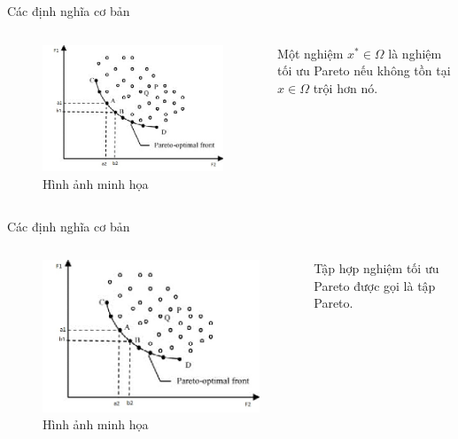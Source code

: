 \documentclass{beamer}
\begin{document}
    \begin{frame}{Các định nghĩa cơ bản}
        \begin{columns}
        \begin{figure}
            \centering
            \includegraphics[scale = 0.5]{paretofront.jpg}
            \caption{Hình ảnh minh họa}
            \label{fig:my_label}
        \end{figure}
        Một nghiệm $x^{*} \in \Omega$ là nghiệm tối ưu Pareto nếu không tồn tại $x \in \Omega$ trội hơn nó.
        \end{columns}
    \end{frame}
    \begin{frame}{Các định nghĩa cơ bản}
        \begin{columns}
        \begin{figure}
            \centering
            \includegraphics[scale = 0.5]{paretofront.jpg}
            \caption{Hình ảnh minh họa}
            \label{fig:my_label}
        \end{figure}
        Tập hợp nghiệm tối ưu Pareto được gọi là tập Pareto.
        \end{columns}
    \end{frame}
\end{document}
